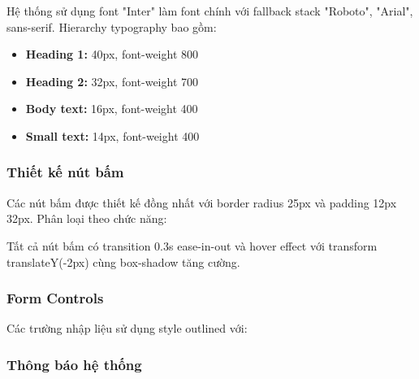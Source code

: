 Hệ thống sử dụng font "Inter" làm font chính với fallback stack "Roboto", "Arial", sans-serif. Hierarchy typography bao gồm:
\begin{itemize}
    \item \textbf{Heading 1:} 40px, font-weight 800
    \item \textbf{Heading 2:} 32px, font-weight 700  
    \item \textbf{Body text:} 16px, font-weight 400
    \item \textbf{Small text:} 14px, font-weight 400
\end{itemize}

\subsubsection{Thiết kế nút bấm}

Các nút bấm được thiết kế đồng nhất với border radius 25px và padding 12px 32px. Phân loại theo chức năng:

Tất cả nút bấm có transition 0.3s ease-in-out và hover effect với transform translateY(-2px) cùng box-shadow tăng cường.

\subsubsection{Form Controls}

Các trường nhập liệu sử dụng style outlined với:

\subsubsection{Thông báo hệ thống}

